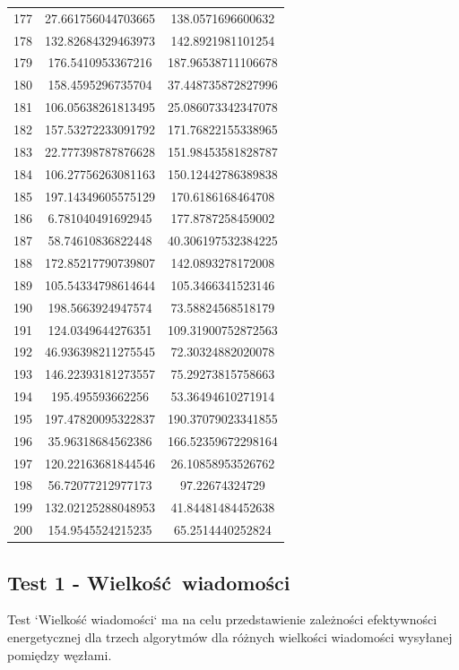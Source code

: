 \documentclass[a4paper,12pt,twoside,openany]{report}
\begin{document}
\begin{longtable}{*{3}{c}}
177	& 27.661756044703665	& 138.0571696600632	\\
178	& 132.82684329463973	& 142.8921981101254	\\
179	& 176.5410953367216	& 187.96538711106678	\\
180	& 158.4595296735704	& 37.448735872827996	\\
181	& 106.05638261813495	& 25.086073342347078	\\
182	& 157.53272233091792	& 171.76822155338965	\\
183	& 22.777398787876628	& 151.98453581828787	\\
184	& 106.27756263081163	& 150.12442786389838	\\
185	& 197.14349605575129	& 170.6186168464708	\\
186	& 6.781040491692945	& 177.8787258459002	\\
187	& 58.74610836822448	& 40.306197532384225	\\
188	& 172.85217790739807	& 142.0893278172008	\\
189	& 105.54334798614644	& 105.3466341523146	\\
190	& 198.5663924947574	& 73.58824568518179	\\
191	& 124.0349644276351	& 109.31900752872563	\\
192	& 46.936398211275545	& 72.30324882020078	\\
193	& 146.22393181273557	& 75.29273815758663	\\
194	& 195.495593662256	& 53.36494610271914	\\
195	& 197.47820095322837	& 190.37079023341855	\\
196	& 35.96318684562386	& 166.52359672298164	\\
197	& 120.22163681844546	& 26.10858953526762	\\
198	& 56.72077212977173	& 97.22674324729	\\
199	& 132.02125288048953	& 41.84481484452638	\\
200	& 154.9545524215235	& 65.2514440252824	\\
\bottomrule
\end{longtable}

\subsection{Test 1 - Wielkość wiadomości}

Test `Wielkość wiadomości` ma na celu przedstawienie zależności efektywności energetycznej dla trzech algorytmów dla różnych wielkości wiadomości wysyłanej pomiędzy węzłami.
\end{document}

